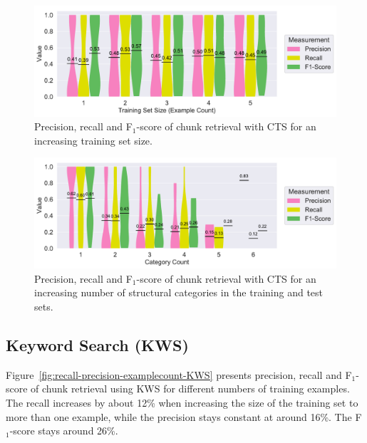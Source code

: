 \begin{figure}[!t]
		\centering
		\includegraphics[width=\columnwidth, clip]{img/big-study/recall-precision-examplecount-CTS.pdf}
		\caption{Precision, recall and F$_{1}$-score of chunk retrieval with CTS for an increasing training set size.}
		\label{fig:recall-precision-examplecount-CTS}
\end{figure}

\begin{figure}[!t]
		\centering
		\includegraphics[width=\columnwidth, clip]{img/big-study/recall-precision-categorycount-CTS.pdf}
		\caption{Precision, recall and F$_{1}$-score of chunk retrieval with CTS for an increasing number of structural categories in the training and test sets.}
		\label{fig:recall-precision-categorycount-CTS}
\end{figure}



\subsection{Keyword Search (KWS)}
Figure~\ref{fig:recall-precision-examplecount-KWS} presents precision, recall and F$_{1}$-score of chunk retrieval using KWS for different numbers of training examples.
The recall increases by about 12\% when increasing the size of the training set to more than one example, while the precision stays constant at around 16\%.
The F$_{1}$-score stays around 26\%.

